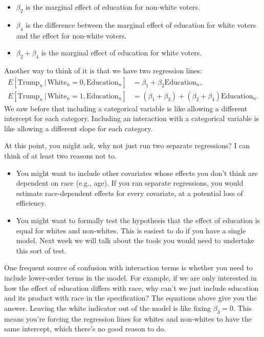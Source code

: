 \documentclass[
  12pt,
  oneside,openany]{book}
\begin{document}
\begin{itemize}
\item
  \(\beta_2\) is the marginal effect of education for non-white voters.
\item
  \(\beta_4\) is the difference between the marginal effect of education for white voters and the effect for non-white voters.
\item
  \(\beta_2 + \beta_4\) is the marginal effect of education for white voters.
\end{itemize}

Another way to think of it is that we have two regression lines:
\[
\begin{aligned}
  E[\text{Trump}_n \,|\, \text{White}_n = 0, \text{Education}_n] &= \beta_1 + \beta_2 \text{Education}_n, \\
  E[\text{Trump}_n \,|\, \text{White}_n = 1, \text{Education}_n] &= (\beta_1 + \beta_3) + (\beta_2 + \beta_4) \text{Education}_n.
\end{aligned}
\]
We saw before that including a categorical variable is like allowing a different intercept for each category. Including an interaction with a categorical variable is like allowing a different slope for each category.

At this point, you might ask, why not just run two separate regressions? I can think of at least two reasons not to.

\begin{itemize}
\item
  You might want to include other covariates whose effects you don't think are dependent on race (e.g., age). If you ran separate regressions, you would estimate race-dependent effects for every covariate, at a potential loss of efficiency.
\item
  You might want to formally test the hypothesis that the effect of education is equal for whites and non-whites. This is easiest to do if you have a single model. Next week we will talk about the tools you would need to undertake this sort of test.
\end{itemize}

One frequent source of confusion with interaction terms is whether you need to include lower-order terms in the model. For example, if we are only interested in how the effect of education differs with race, why can't we just include education and its product with race in the specification? The equations above give you the answer. Leaving the white indicator out of the model is like fixing \(\beta_3 = 0\). This means you're forcing the regression lines for whites and non-whites to have the same intercept, which there's no good reason to do.
\end{document}
